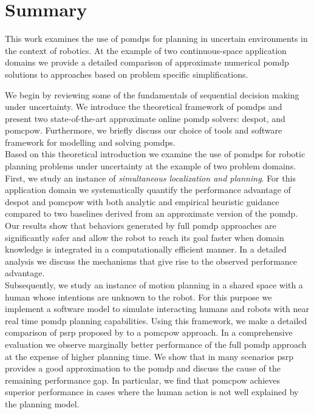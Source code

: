 \chapter{Summary}\label{chap:summary}

This work examines the use of \acfp{pomdp} for planning in uncertain
environments in the context of robotics. At the example of two continuous-space
application domains we provide a detailed comparison of approximate numerical
\ac{pomdp} solutions to approaches based on problem specific simplifications.

We begin by reviewing some of the fundamentals of sequential decision making
under uncertainty. We introduce the theoretical framework of \acp{pomdp} and
present two state-of-the-art approximate online \ac{pomdp} solvers:
\acf{despot}, and \acf{pomcpow}. Furthermore, we briefly discuss our choice of
tools and software framework for modelling and solving
\acp{pomdp}.\\
Based on this theoretical introduction we examine the use of \acp{pomdp} for
robotic planning problems under uncertainty at the example of two problem
domains.\\
First, we study an instance of \emph{simultaneous localization and planning}.
For this application domain we systematically quantify the performance
advantage of \ac{despot} and \ac{pomcpow} with both analytic and empirical
heuristic guidance compared to two baselines derived from an approximate
version of the \ac{pomdp}. Our results show that behaviors generated by full
\ac{pomdp} approaches are significantly safer and allow the robot to reach its
goal faster when domain knowledge is integrated in a computationally efficient
manner. In a detailed analysis we discuss the mechanisms that give rise to the
observed performance advantage.\\
Subsequently, we study an instance of motion planning in a shared space with
a human whose intentions are unknown to the robot. For this purpose we
implement a software model to simulate interacting humans and robots with near
real time \ac{pomdp} planning capabilities. Using this framework, we make
a detailed comparison of \acf{psrp} proposed by
\cite{fisac2018probabilistically} to a \ac{pomcpow} approach. In
a comprehensive evaluation we observe marginally better performance of the full
\ac{pomdp} approach at the expense of higher planning time. We show that in
many scenarios \ac{psrp} provides a good approximation to the \ac{pomdp} and
discuss the cause of the remaining performance gap. In particular, we find that
\ac{pomcpow} achieves superior performance in cases where the human action is
not well explained by the planning model.

